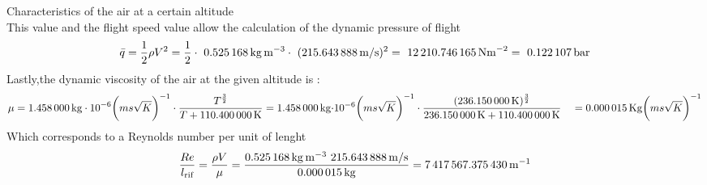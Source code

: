 \documentclass[[12pt,twoside]{book}
\begin{document}
\begin{myExampleX}{Characteristics of the air at a certain altitude}{}
\[\]
%
This value and the flight speed value allow the calculation of the dynamic pressure of flight
\[
\bar{q}=\frac{1}{2} \rho V^{2} =\frac{1}{2}\cdot\ \SI[round-precision=3]{\myDensity}{kg~m^{-3}} \cdot\ (\SI[round-precision=2]{\mySpeedMs}{m/s})^{2} =~\SI[round-precision=2]{\myDynamicpressureNm}{N m^{-2}}=~\SI[round-precision=3]{\myDynamicpressureBar}{bar}
\]
Lastly,the dynamic viscosity of the air at the given  altitude is :
\[
\begin{split}
 \mu =  \SI[round-precision=3]{\myCone}{{kg}\cdot 10^{-6}} \biggl({m s \sqrt{K} }\biggr)^{-1} \cdot \frac {T^{\frac{3}{2}}}{T+\SI[round-precision=1]{\myCtwo}{K}}     
& {}=
 \SI[round-precision=3]{\myCone}{kg}{\cdot 10^{-6}} \biggl({m s \sqrt{K} }\biggr)^{-1} \cdot \frac {(\SI[round-precision=2]{\myTemperatureK}{K})^{\frac{3}{2}}}{\SI[round-precision=2]{\myTemperatureK}{K}+\SI[round-precision=1]{\myCtwo}{K}} 
 & {}=
 \SI[round-precision=6]{\myDynamicviscosity }{Kg}{\biggl({m s \sqrt{K} }\biggr)^{-1}}
 \end{split}
\]
Which corresponds to a Reynolds number per unit of lenght
\[
 \frac{ Re }{l_\text{rif} } =\frac{ \rho V}{\mu }=\frac{ \SI[round-precision=3]{\myDensity}{kg~m^{-3}}~ \SI[round-precision=2]{\mySpeedMs}{m/s}}{\SI[round-precision=6]{\myDynamicviscosity }{kg} }  = \SI[round-precision=0]{\myReynoldsnumeberperunitoflenght}{m^{-1}}
\]

\end{myExampleX}
\end{document}

